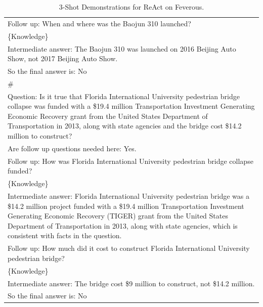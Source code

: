 \begin{table}[t!]
{\begin{tabular}{p{\textwidth}}
Follow up: When and where was the Baojun 310 launched?\\
\{Knowledge\}\\
Intermediate answer: The Baojun 310 was launched on 2016 Beijing Auto Show, not 2017 Beijing Auto Show.\\
So the final answer is: No\\
\#\\
Question: Is it true that Florida International University pedestrian bridge collapse was funded with a \$19.4 million Transportation Investment Generating Economic Recovery grant from the United States Department of Transportation in 2013, along with state agencies and the bridge cost \$14.2 million to construct?\\
Are follow up questions needed here: Yes.\\
Follow up: How was Florida International University pedestrian bridge collapse funded?\\
\{Knowledge\}\\
Intermediate answer: Florida International University pedestrian bridge was a \$14.2 million project funded with a \$19.4 million Transportation Investment Generating Economic Recovery (TIGER) grant from the United States Department of Transportation in 2013, along with state agencies, which is consistent with facts in the question.\\
Follow up: How much did it cost to construct Florida International University pedestrian bridge?\\
\{Knowledge\}\\
Intermediate answer: The bridge cost \$9 million to construct, not \$14.2 million.\\
So the final answer is: No\\
\bottomrule
\end{tabular}
}
\caption{3-Shot Demonstrations for ReAct on Feverous.}\label{tab:Feverous-react}
\end{table}
\endgroup

